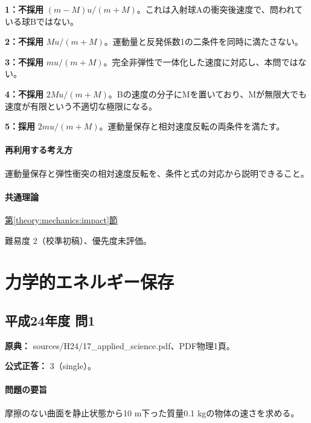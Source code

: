 \noindent\textbf{1：不採用} \((m-M)u/(m+M)\)。これは入射球Aの衝突後速度で、問われている球Bではない。\par

\noindent\textbf{2：不採用} \(Mu/(m+M)\)。運動量と反発係数1の二条件を同時に満たさない。\par

\noindent\textbf{3：不採用} \(mu/(m+M)\)。完全非弾性で一体化した速度に対応し、本問ではない。\par

\noindent\textbf{4：不採用} \(2Mu/(m+M)\)。Bの速度の分子にMを置いており、Mが無限大でも速度が有限という不適切な極限になる。\par

\noindent\textbf{5：採用} \(2mu/(m+M)\)。運動量保存と相対速度反転の両条件を満たす。\par

\paragraph{再利用する考え方} 運動量保存と弾性衝突の相対速度反転を、条件と式の対応から説明できること。

\paragraph{共通理論} \hyperref[theory:mechanics:impact]{第\ref*{theory:mechanics:impact}節}

\par 難易度 2（校準初稿）、優先度未評価。

\section{力学的エネルギー保存}

\subsection{平成24年度 問1}
\label{q:h24-reg-applied-01}

\noindent\textbf{原典：} sources/H24/17\_applied\_science.pdf、PDF物理1頁。

\textbf{公式正答：} 3（single）。

\paragraph{問題の要旨} 摩擦のない曲面を静止状態から10 m下った質量0.1 kgの物体の速さを求める。

